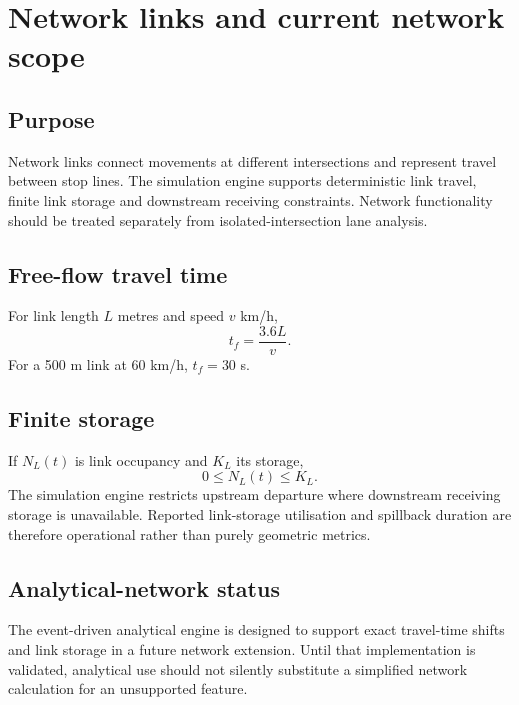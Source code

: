 \chapter{Network links and current network scope}
\label{chap:networks}

\section{Purpose}
Network links connect movements at different intersections and represent travel between
stop lines.  The simulation engine supports deterministic link travel, finite link
storage and downstream receiving constraints.  Network functionality should be treated
separately from isolated-intersection lane analysis.

\section{Free-flow travel time}
For link length $L$ metres and speed $v$ km/h,
\begin{equation}
t_f=\frac{3.6L}{v}.
\end{equation}
For a 500 m link at 60 km/h, $t_f=30$ s.

\section{Finite storage}
If $N_L(t)$ is link occupancy and $K_L$ its storage,
\begin{equation}
0\leq N_L(t)\leq K_L.
\end{equation}
The simulation engine restricts upstream departure where downstream receiving storage
is unavailable.  Reported link-storage utilisation and spillback duration are therefore
operational rather than purely geometric metrics.

\section{Analytical-network status}
The event-driven analytical engine is designed to support exact travel-time shifts and
link storage in a future network extension.  Until that implementation is validated,
analytical use should not silently substitute a simplified network calculation for an
unsupported feature.
